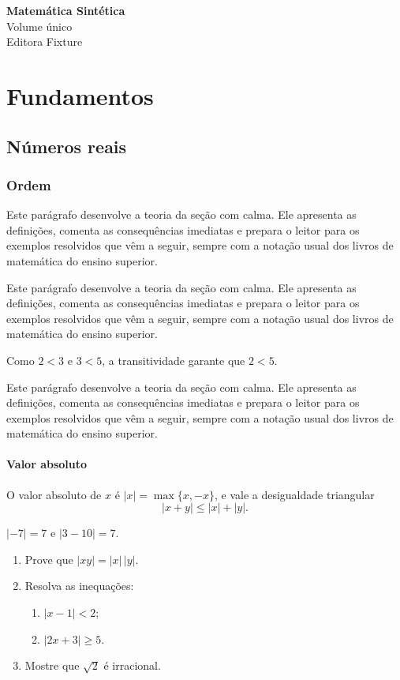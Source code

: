 \documentclass[11pt,oneside]{book}
\newcommand{\texto}{Este parágrafo desenvolve a teoria da seção com calma. Ele apresenta as
definições, comenta as consequências imediatas e prepara o leitor para os exemplos resolvidos
que vêm a seguir, sempre com a notação usual dos livros de matemática do ensino superior.\par}
\begin{document}
\frontmatter
\begin{titlepage}\centering\vspace*{5cm}
{\Huge\bfseries Matemática Sintética}\\[1cm]{\Large Volume único}\\[4cm]{\large Editora Fixture}
\end{titlepage}
\tableofcontents
\mainmatter
\part{Fundamentos}
\chapter{Números reais}
\section{Ordem}
\texto\texto
\begin{exemplo}
Como $2 < 3$ e $3 < 5$, a transitividade garante que $2 < 5$.
\end{exemplo}
\texto
\subsection{Valor absoluto}
O valor absoluto de $x$ é $|x| = \max\{x, -x\}$, e vale a desigualdade triangular
\[ |x + y| \le |x| + |y|. \]
\begin{exemplo}
$|-7| = 7$ e $|3 - 10| = 7$.
\end{exemplo}
\blocoexercicios
\begin{enumerate}[label=\textbf{\arabic*.}]
\item Prove que $|xy| = |x|\,|y|$.
\item Resolva as inequações:
  \begin{enumerate}
  \item $|x - 1| < 2$;
  \item $|2x + 3| \ge 5$.
  \end{enumerate}
\item Mostre que $\sqrt{2}$ é irracional.
\end{enumerate}
\end{document}
